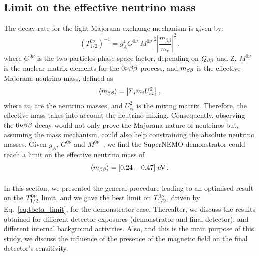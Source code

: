 
\subsection{Limit on the effective neutrino mass}

The decay rate for the light Majorana exchange mechanism is given by:
\begin{equation}
  (T_{1/2}^{0\nu})^{-1} = g_{A}^{4}G^{0\nu}|M^{0\nu}|^{2}\left\lvert\dfrac{m_{\beta\beta}}{m_{e}}\right\rvert^{2}\,.
\end{equation}
where $G^{0\nu}$ is the two particles phase space factor, depending on $Q_{\beta\beta}$ and Z, $M^{0\nu}$ is the nuclear matrix elements for the $0\nu\beta\beta$ process, and $m_{\beta\beta}$ is the effective Majorana neutrino mass, defined as
\begin{equation}
  \langle m_{\beta\beta} \rangle = \left\vert \Sigma_{i}m_{i}U^{2}_{ei} \right\vert \,,
\end{equation}
where $m_{i}$ are the neutrino masses, and $U^{2}_{ei}$ is the mixing matrix.
Therefore, the effective mass takes into account the neutrino mixing.
Consequently, observing the $0\nu\beta\beta$ decay would not only prove the Majorana nature of neutrinos but, assuming the mass mechanism, could also help constraining the absolute neutrino masses.
Given $g_{A}$, $G^{0\nu}$ and $M^{0\nu}$~\cite{PhysRevC.85.034316}\cite{MENENDEZ2009139}\cite{PhysRevLett.116.112502}\cite{PhysRevC.91.034304}\cite{PhysRevC.91.024613}\cite{PhysRevC.87.045501}\cite{PhysRevLett.111.142501}\cite{PhysRevC.91.024316}\cite{PhysRevC.82.064310}\cite{PhysRevC.83.034320}, we find the SuperNEMO demonstrator could reach a limit on the effective neutrino mass of
\begin{equation}
\langle m_{\beta\beta}\rangle = [0.24-0.47]~\text{eV}\,.
\end{equation}




\paragraph{}
In this section, we presented the general procedure leading to an optimised result on the $T_{1/2}^{0\nu}$ limit, and we gave the best limit on $T_{1/2}^{0\nu}$, driven by Eq.~\eqref{eq:tbeta_limit}, for the demonstrator case.
Thereafter, we discuss the results obtained for different detector exposures (demonstrator and final detector), and different internal background activities.
Also, and this is the main purpose of this study, we discuss the influence of the presence of the magnetic field on the final detector's sensitivity.


